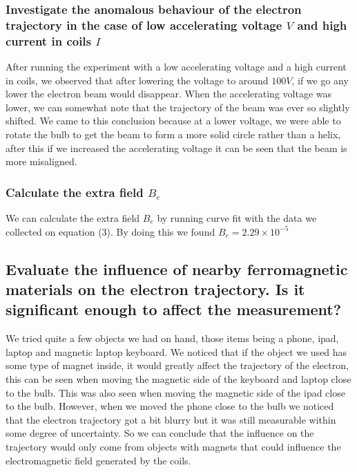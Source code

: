 \documentclass{article}
\begin{document}
\subsubsection*{Investigate the anomalous behaviour of the electron trajectory
in the case of low accelerating voltage $V$ and high current in coils $I$}
After running the experiment with a low accelerating voltage and a high current
in coils, we observed that after lowering the voltage to around $100V$, if we go
any lower the electron beam would disappear. When the accelerating voltage was
lower, we can somewhat note that the trajectory of the beam was ever so slightly
shifted. We came to this conclusion because at a lower voltage, we were able to
rotate the bulb to get the beam to form a more solid circle rather than a helix,
after this if we increased the accelerating voltage it can be seen that the
beam is more misaligned.
\subsubsection*{Calculate the extra field $B_e$}
We can calculate the extra field $B_e$ by running curve fit with the data we
collected on equation (3). By doing this we found $B_e = 2.29\times10^{-5}$

\subsection*{Evaluate the influence of nearby ferromagnetic materials on the
electron trajectory. Is it significant enough to affect the measurement?}
We tried quite a few objects we had on hand, those items being a phone, ipad,
laptop and magnetic laptop keyboard. We noticed that if the object we used has
some type of magnet inside, it would greatly affect the trajectory of the electron,
this can be seen when moving the magnetic side of the keyboard and laptop close
to the bulb. This was also seen when moving the magnetic side of the ipad close
to the bulb. However, when we moved the phone close to the bulb we noticed that
the electron trajectory got a bit blurry but it was still measurable within some
degree of uncertainty. So we can conclude that the influence on the trajectory
would only come from objects with magnets that could influence the electromagnetic
field generated by the coils.

\newpage
\end{document}
